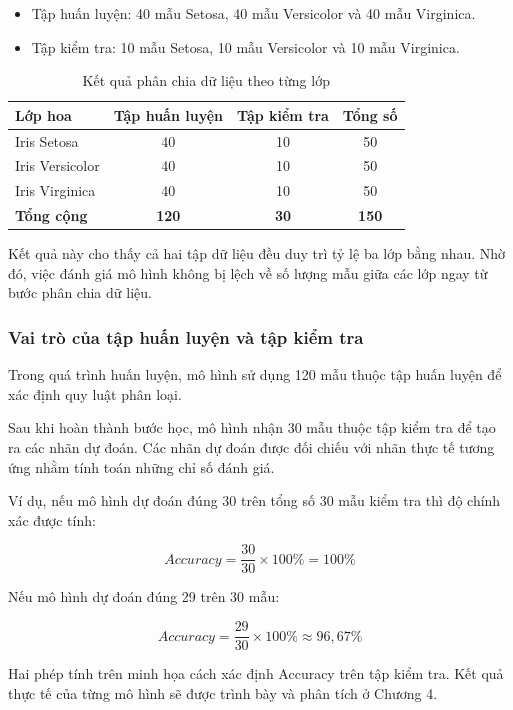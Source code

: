 \documentclass[14pt]{extarticle}
\begin{document}
	\begin{itemize}
		\item Tập huấn luyện: 40 mẫu Setosa, 40 mẫu Versicolor và 40 mẫu Virginica.
		\item Tập kiểm tra: 10 mẫu Setosa, 10 mẫu Versicolor và 10 mẫu Virginica.
	\end{itemize}
	
	\begin{table}[htbp]
		\centering
		\caption{Kết quả phân chia dữ liệu theo từng lớp}
		\label{tab:iris-split}
		\begin{tabular}{|l|c|c|c|}
			\hline
			\textbf{Lớp hoa} &
			\textbf{Tập huấn luyện} &
			\textbf{Tập kiểm tra} &
			\textbf{Tổng số} \\
			\hline
			Iris Setosa & 40 & 10 & 50 \\
			\hline
			Iris Versicolor & 40 & 10 & 50 \\
			\hline
			Iris Virginica & 40 & 10 & 50 \\
			\hline
			\textbf{Tổng cộng} & \textbf{120} & \textbf{30} & \textbf{150} \\
			\hline
		\end{tabular}
	\end{table}
	
	Kết quả này cho thấy cả hai tập dữ liệu đều duy trì tỷ lệ ba lớp bằng nhau. Nhờ đó, việc đánh giá mô hình không bị lệch về số lượng mẫu giữa các lớp ngay từ bước phân chia dữ liệu.
	
	\subsubsection{Vai trò của tập huấn luyện và tập kiểm tra}
	
	Trong quá trình huấn luyện, mô hình sử dụng 120 mẫu thuộc tập huấn luyện để xác định quy luật phân loại.
	
	Sau khi hoàn thành bước học, mô hình nhận 30 mẫu thuộc tập kiểm tra để tạo ra các nhãn dự đoán. Các nhãn dự đoán được đối chiếu với nhãn thực tế tương ứng nhằm tính toán những chỉ số đánh giá.
	
	Ví dụ, nếu mô hình dự đoán đúng 30 trên tổng số 30 mẫu kiểm tra thì độ chính xác được tính:
	
	\[
	Accuracy=\frac{30}{30}\times100\%=100\%
	\]
	
	Nếu mô hình dự đoán đúng 29 trên 30 mẫu:
	
	\[
	Accuracy=\frac{29}{30}\times100\%\approx96,67\%
	\]
	
	Hai phép tính trên minh họa cách xác định Accuracy trên tập kiểm tra. Kết quả thực tế của từng mô hình sẽ được trình bày và phân tích ở Chương 4.
	
\end{document}
